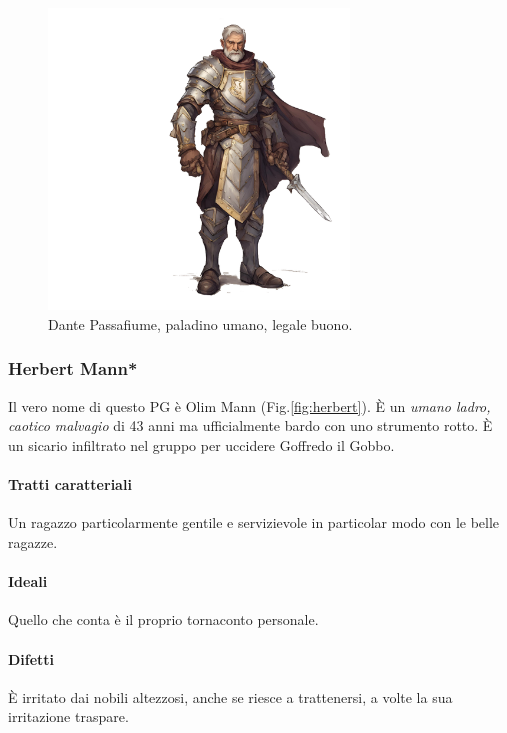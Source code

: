 \documentclass[letterpaper,twocolumn,openany,nodeprecatedcode]{dndbook}
\begin{document}
\begin{figure}
\centering
\includegraphics[width=8cm]{img/dante-passafiume.png}
    \caption{\textsf{Dante Passafiume, paladino umano, legale buono.}\cite{url:ai}}
    \label{fig:dante}
\end{figure}



\subsubsection{Herbert Mann*}
Il vero nome di questo PG è Olim Mann (Fig.\ref{fig:herbert}). È un \textit{umano ladro, caotico malvagio} di 43 anni ma ufficialmente bardo con uno strumento rotto. È un sicario infiltrato nel gruppo per uccidere Goffredo il Gobbo.
\paragraph{Tratti caratteriali} Un ragazzo particolarmente gentile e servizievole in particolar modo con le belle ragazze.
\paragraph{Ideali} Quello che conta è il proprio tornaconto personale.
\paragraph{Difetti} È irritato dai nobili altezzosi, anche se riesce a trattenersi, a volte la sua irritazione traspare. 
\end{document}
